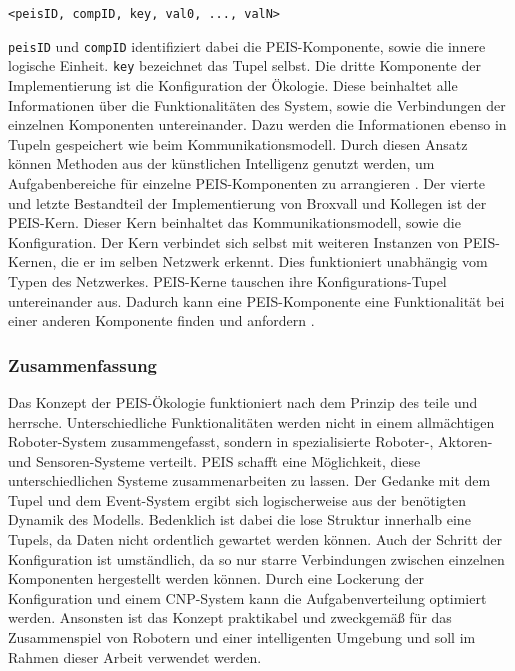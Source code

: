 {\tt <peisID, compID, key, val0, ..., valN>}

{\tt peisID} und {\tt compID} identifiziert dabei die PEIS-Komponente, sowie die innere logische Einheit. {\tt key} bezeichnet das Tupel selbst. Die dritte Komponente der Implementierung ist die Konfiguration der Ökologie. Diese beinhaltet alle Informationen über die Funktionalitäten des System, sowie die Verbindungen der einzelnen Komponenten untereinander. Dazu werden die Informationen ebenso in Tupeln gespeichert wie beim Kommunikationsmodell. Durch diesen Ansatz können Methoden aus der künstlichen Intelligenz genutzt werden, um Aufgabenbereiche für einzelne PEIS-Komponenten zu arrangieren \citep{lundh2005can}. Der vierte und letzte Bestandteil der Implementierung von Broxvall und Kollegen ist der PEIS-Kern. Dieser Kern beinhaltet das Kommunikationsmodell, sowie die Konfiguration. Der Kern verbindet sich selbst mit weiteren Instanzen von PEIS-Kernen, die er im selben Netzwerk erkennt. Dies funktioniert unabhängig vom Typen des Netzwerkes. PEIS-Kerne tauschen ihre Konfigurations-Tupel untereinander aus. Dadurch kann eine PEIS-Komponente eine Funktionalität bei einer anderen Komponente finden und anfordern \citep{Saffiotti:2005:PEA:1107548.1107615}.

\subsubsection{Zusammenfassung}
Das Konzept der PEIS-Ökologie funktioniert nach dem Prinzip des teile und herrsche. Unterschiedliche Funktionalitäten werden nicht in einem allmächtigen Roboter-System zusammengefasst, sondern in spezialisierte Roboter-, Aktoren- und Sensoren-Systeme verteilt. PEIS schafft eine Möglichkeit, diese unterschiedlichen Systeme zusammenarbeiten zu lassen. Der Gedanke mit dem Tupel und dem Event-System ergibt sich logischerweise aus der benötigten Dynamik des Modells. Bedenklich ist dabei die lose Struktur innerhalb eine Tupels, da Daten nicht ordentlich gewartet werden können. Auch der Schritt der Konfiguration ist umständlich, da so nur starre Verbindungen zwischen einzelnen Komponenten hergestellt werden können. Durch eine Lockerung der Konfiguration und einem CNP-System kann die Aufgabenverteilung optimiert werden. Ansonsten ist das Konzept praktikabel und zweckgemäß für das Zusammenspiel von Robotern und einer intelligenten Umgebung und soll im Rahmen dieser Arbeit verwendet werden.

